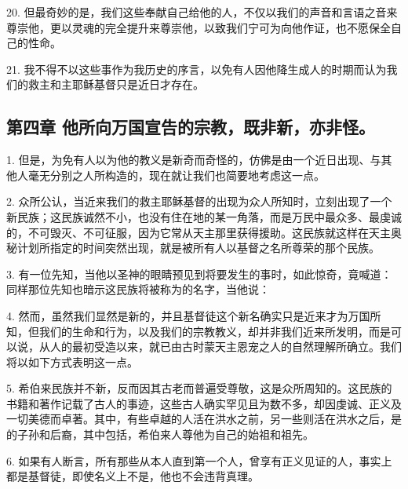 20. 但最奇妙的是，我们这些奉献自己给他的人，不仅以我们的声音和言语之音来尊崇他，更以灵魂的完全提升来尊崇他，以致我们宁可为向他作证，也不愿保全自己的性命。\par

21. 我不得不以这些事作为我历史的序言，以免有人因他降生成人的时期而认为我们的救主和主耶稣基督只是近日才存在。\par


\subsection{第四章 他所向万国宣告的宗教，既非新，亦非怪。}

1. 但是，为免有人以为他的教义是新奇而奇怪的，仿佛是由一个近日出现、与其他人毫无分别之人所构造的，现在就让我们也简要地考虑这一点。\par

2. 众所公认，当近来我们的救主耶稣基督的出现为众人所知时，立刻出现了一个新民族；这民族诚然不小，也没有住在地的某一角落，而是万民中最众多、最虔诚的，不可毁灭、不可征服，因为它常从天主那里获得援助。这民族就这样在天主奥秘计划所指定的时间突然出现，就是被所有人以基督之名所尊荣的那个民族。\par

3. 有一位先知，当他以圣神的眼睛预见到将要发生的事时，如此惊奇，竟喊道： 同样那位先知也暗示这民族将被称为的名字，当他说：\par

4. 然而，虽然我们显然是新的，并且基督徒这个新名确实只是近来才为万国所知，但我们的生命和行为，以及我们的宗教教义，却并非我们近来所发明，而是可以说，从人的最初受造以来，就已由古时蒙天主恩宠之人的自然理解所确立。我们将以如下方式表明这一点。\par

5. 希伯来民族并不新，反而因其古老而普遍受尊敬，这是众所周知的。这民族的书籍和著作记载了古人的事迹，这些古人确实罕见且为数不多，却因虔诚、正义及一切美德而卓著。其中，有些卓越的人活在洪水之前，另一些则活在洪水之后，是的子孙和后裔，其中包括，希伯来人尊他为自己的始祖和祖先。\par

6. 如果有人断言，所有那些从本人直到第一个人，曾享有正义见证的人，事实上都是基督徒，即使名义上不是，他也不会违背真理。\par

